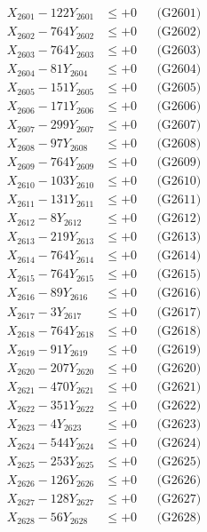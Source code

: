 \documentclass[a4paper,10pt]{article}
\begin{document}
{\begin{align}
\allowbreak
X_{2601} - 122Y_{2601} &\leq +0 && \text{(G2601)} \\
X_{2602} - 764Y_{2602} &\leq +0 && \text{(G2602)} \\
X_{2603} - 764Y_{2603} &\leq +0 && \text{(G2603)} \\
X_{2604} - 81Y_{2604} &\leq +0 && \text{(G2604)} \\
X_{2605} - 151Y_{2605} &\leq +0 && \text{(G2605)} \\
X_{2606} - 171Y_{2606} &\leq +0 && \text{(G2606)} \\
X_{2607} - 299Y_{2607} &\leq +0 && \text{(G2607)} \\
X_{2608} - 97Y_{2608} &\leq +0 && \text{(G2608)} \\
X_{2609} - 764Y_{2609} &\leq +0 && \text{(G2609)} \\
X_{2610} - 103Y_{2610} &\leq +0 && \text{(G2610)} \\
\allowbreak
X_{2611} - 131Y_{2611} &\leq +0 && \text{(G2611)} \\
X_{2612} - 8Y_{2612} &\leq +0 && \text{(G2612)} \\
X_{2613} - 219Y_{2613} &\leq +0 && \text{(G2613)} \\
X_{2614} - 764Y_{2614} &\leq +0 && \text{(G2614)} \\
X_{2615} - 764Y_{2615} &\leq +0 && \text{(G2615)} \\
X_{2616} - 89Y_{2616} &\leq +0 && \text{(G2616)} \\
X_{2617} - 3Y_{2617} &\leq +0 && \text{(G2617)} \\
X_{2618} - 764Y_{2618} &\leq +0 && \text{(G2618)} \\
X_{2619} - 91Y_{2619} &\leq +0 && \text{(G2619)} \\
X_{2620} - 207Y_{2620} &\leq +0 && \text{(G2620)} \\
\allowbreak
X_{2621} - 470Y_{2621} &\leq +0 && \text{(G2621)} \\
X_{2622} - 351Y_{2622} &\leq +0 && \text{(G2622)} \\
X_{2623} - 4Y_{2623} &\leq +0 && \text{(G2623)} \\
X_{2624} - 544Y_{2624} &\leq +0 && \text{(G2624)} \\
X_{2625} - 253Y_{2625} &\leq +0 && \text{(G2625)} \\
X_{2626} - 126Y_{2626} &\leq +0 && \text{(G2626)} \\
X_{2627} - 128Y_{2627} &\leq +0 && \text{(G2627)} \\
X_{2628} - 56Y_{2628} &\leq +0 && \text{(G2628)} \\

\end{align}}
\end{document}
